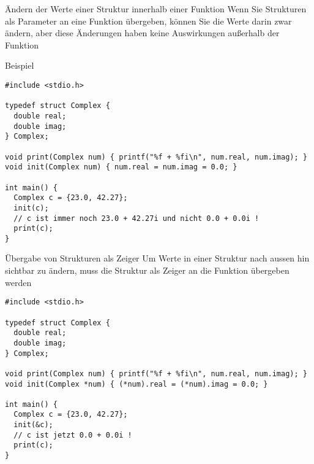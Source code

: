 \documentclass[presentation]{beamer}
\begin{document}
\begin{frame}[label={sec:org7c28c2f},fragile]{Ändern der Werte einer Struktur innerhalb einer Funktion}
 Wenn Sie Strukturen als Parameter an eine Funktion übergeben, können
Sie die Werte darin zwar ändern, aber \alert{diese Änderungen haben keine
Auswirkungen außerhalb der Funktion}
\begin{exampleblock}{Beispiel}
\begin{verbatim}
#include <stdio.h>

typedef struct Complex {
  double real;
  double imag;
} Complex;

void print(Complex num) { printf("%f + %fi\n", num.real, num.imag); }
void init(Complex num) { num.real = num.imag = 0.0; }

int main() {
  Complex c = {23.0, 42.27};
  init(c);
  // c ist immer noch 23.0 + 42.27i und nicht 0.0 + 0.0i !
  print(c);
}
\end{verbatim}
\end{exampleblock}
\end{frame}
\begin{frame}[label={sec:org506cbfa},fragile]{Übergabe von Strukturen als Zeiger}
 Um Werte in einer Struktur nach aussen hin sichtbar zu ändern, muss
die Struktur als Zeiger an die Funktion übergeben werden
\begin{verbatim}
#include <stdio.h>

typedef struct Complex {
  double real;
  double imag;
} Complex;

void print(Complex num) { printf("%f + %fi\n", num.real, num.imag); }
void init(Complex *num) { (*num).real = (*num).imag = 0.0; }

int main() {
  Complex c = {23.0, 42.27};
  init(&c);
  // c ist jetzt 0.0 + 0.0i !
  print(c);
}
\end{verbatim}
\end{frame}
\end{document}
